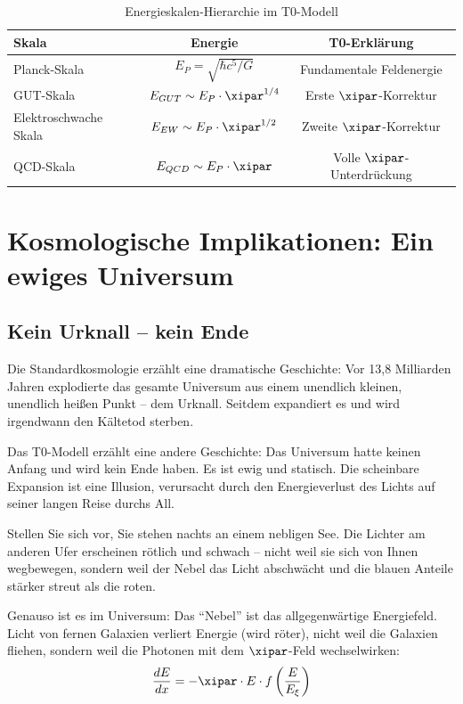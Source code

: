 	\begin{table}[H]
		\centering
		\begin{tabular}{lcc}
			\toprule
			\textbf{Skala} & \textbf{Energie} & \textbf{T0-Erklärung} \\
			\midrule
			Planck-Skala & $E_P = \sqrt{\hbar c^5/G}$ & Fundamentale Feldenergie \\
			GUT-Skala & $E_{GUT} \sim E_P \cdot \xipar^{1/4}$ & Erste $\xipar$-Korrektur \\
			Elektroschwache Skala & $E_{EW} \sim E_P \cdot \xipar^{1/2}$ & Zweite $\xipar$-Korrektur \\
			QCD-Skala & $E_{QCD} \sim E_P \cdot \xipar$ & Volle $\xipar$-Unterdrückung \\
			\bottomrule
		\end{tabular}
		\caption{Energieskalen-Hierarchie im T0-Modell}
	\end{table}
	
	\section{Kosmologische Implikationen: Ein ewiges Universum}
	
	\subsection{Kein Urknall -- kein Ende}
	
	Die Standardkosmologie erzählt eine dramatische Geschichte: Vor 13,8 Milliarden Jahren explodierte das gesamte Universum aus einem unendlich kleinen, unendlich heißen Punkt -- dem Urknall. Seitdem expandiert es und wird irgendwann den Kältetod sterben.
	
	Das T0-Modell erzählt eine andere Geschichte: Das Universum hatte keinen Anfang und wird kein Ende haben. Es ist ewig und statisch. Die scheinbare Expansion ist eine Illusion, verursacht durch den Energieverlust des Lichts auf seiner langen Reise durchs All.
	
	\begin{revolutionary}
		Stellen Sie sich vor, Sie stehen nachts an einem nebligen See. Die Lichter am anderen Ufer erscheinen rötlich und schwach -- nicht weil sie sich von Ihnen wegbewegen, sondern weil der Nebel das Licht abschwächt und die blauen Anteile stärker streut als die roten. 
		
		Genauso ist es im Universum: Das ``Nebel'' ist das allgegenwärtige Energiefeld. Licht von fernen Galaxien verliert Energie (wird röter), nicht weil die Galaxien fliehen, sondern weil die Photonen mit dem $\xipar$-Feld wechselwirken:
		\begin{equation}
			\frac{dE}{dx} = -\xipar \cdot E \cdot f\left(\frac{E}{E_\xi}\right)
		\end{equation}
	\end{revolutionary}
	
